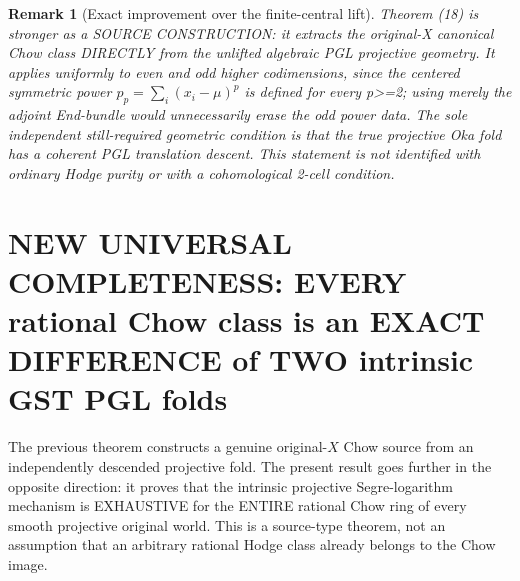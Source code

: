 \documentclass[11pt]{article}
\newtheorem{remark}[theorem]{Remark}
\begin{document}
\begin{remark}[Exact improvement over the finite-central lift]
Theorem (18) is stronger
as a SOURCE CONSTRUCTION:
it extracts the original-X
canonical Chow class DIRECTLY
from the unlifted algebraic
PGL projective geometry.
It applies uniformly to even
and odd higher codimensions,
since the centered symmetric
power $p_p=\sum_i(x_i-\mu)^p$
is defined for every p>=2;
using merely the adjoint
End-bundle would unnecessarily
erase the odd power data.
The sole independent
still-required geometric
condition is that the true
projective Oka fold has a
coherent PGL translation
descent. This statement is
not identified with ordinary
Hodge purity or with a
cohomological 2-cell condition.
\end{remark}

\section{NEW UNIVERSAL COMPLETENESS: EVERY rational Chow class is an EXACT DIFFERENCE of TWO intrinsic GST PGL folds}

The previous theorem constructs a genuine original-$X$ Chow source from
an independently descended projective fold. The present result goes
further in the opposite direction: it proves that the intrinsic
projective Segre-logarithm mechanism is EXHAUSTIVE for the ENTIRE
rational Chow ring of every smooth projective original world.
This is a source-type theorem, not an assumption that an arbitrary
rational Hodge class already belongs to the Chow image.
\end{document}
